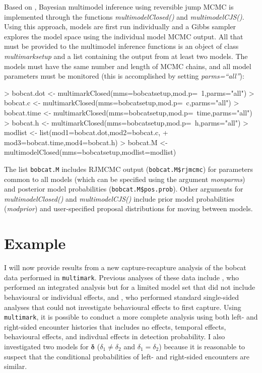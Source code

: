 \documentclass[12pt]{article}
\begin{document}
Based on \cite{BarkerLink2013}, Bayesian multimodel inference using reversible jump MCMC is implemented through the functions \textit{multimodelClosed()} and \textit{multimodelCJS()}. Using this approach, models are first run individually and a Gibbs sampler explores the model space using the individual model MCMC output. All that must be provided to the multimodel inference functions is an object of class \textit{multimarksetup} and a list containing the output from at least two models. The models must have the same number and length of MCMC chains, and all model parameters must be monitored (this is accomplished by setting \textit{parms=``all''}):
\begin{Schunk}
\begin{Sinput}
> bobcat.dot <- multimarkClosed(mms=bobcatsetup,mod.p=~1,parms="all")
> bobcat.c <- multimarkClosed(mms=bobcatsetup,mod.p=~c,parms="all")
> bobcat.time <- multimarkClosed(mms=bobcatsetup,mod.p=~time,parms="all")
> bobcat.h <- multimarkClosed(mms=bobcatsetup,mod.p=~h,parms="all")
> modlist <- list(mod1=bobcat.dot,mod2=bobcat.c,
+                 mod3=bobcat.time,mod4=bobcat.h)
> bobcat.M <- multimodelClosed(mms=bobcatsetup,modlist=modlist)
\end{Sinput}
\end{Schunk}
The list \verb|bobcat.M| includes RJMCMC output (\verb|bobcat.M$rjmcmc|) for parameters common to all models (which can be specified using the argument \textit{monparms}) and posterior model probabilities (\verb|bobcat.M$pos.prob|). Other arguments for \textit{multimodelClosed()} and \textit{multimodelCJS()} include prior model probabilities (\textit{modprior}) and user-specified proposal distributions for moving between models.

\section{Example}
I will now provide results from a new capture-recapture analysis of the bobcat data performed in \verb|multimark|. Previous analyses of these data include \cite{McClintockEtAl2013a}, who performed an integrated analysis but for a limited model set that did not include behavioural or individual effects, and \cite{AlonsoEtAl2015}, who performed standard single-sided analyses that could not investigate behavioural effects to first capture. Using \verb|multimark|, it is possible to conduct a more complete analysis using both left- and right-sided encounter histories that includes no effects, temporal effects, behavioural effects, and indivdual effects in detection probability. I also investigated two models for ${\boldsymbol \delta}$ ($\delta_1 \ne \delta_2$ and $\delta_1 = \delta_2$) because it is reasonable to suspect that the conditional probabilities of left- and right-sided encounters are similar. 
\end{document}
